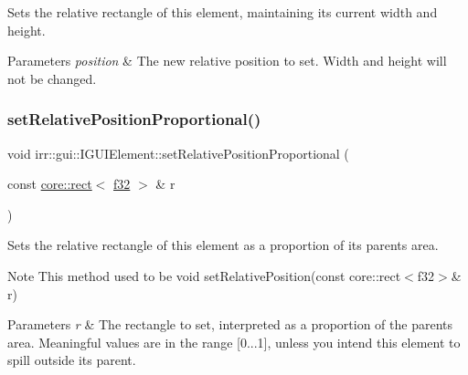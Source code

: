 Sets the relative rectangle of this element, maintaining its current width and height. 


\begin{DoxyParams}{Parameters}
{\em position} & The new relative position to set. Width and height will not be changed. \\
\hline
\end{DoxyParams}
\mbox{\label{classirr_1_1gui_1_1IGUIElement_aa67e02ab54db1068e7c057721d2f24a5}} 
\subsubsection{\texorpdfstring{set\+Relative\+Position\+Proportional()}{setRelativePositionProportional()}}
{\footnotesize\ttfamily void irr\+::gui\+::\+I\+G\+U\+I\+Element\+::set\+Relative\+Position\+Proportional (\begin{DoxyParamCaption}\item[{const \hyperlink{classirr_1_1core_1_1rect}{core\+::rect}$<$ \hyperlink{namespaceirr_a0277be98d67dc26ff93b1a6a1d086b07}{f32} $>$ \&}]{r }\end{DoxyParamCaption})\hspace{0.3cm}{\ttfamily [inline]}}



Sets the relative rectangle of this element as a proportion of its parent\textquotesingle{}s area. 

\begin{DoxyNote}{Note}
This method used to be \textquotesingle{}void set\+Relative\+Position(const core\+::rect$<$f32$>$\& r)\textquotesingle{} 
\end{DoxyNote}

\begin{DoxyParams}{Parameters}
{\em r} & The rectangle to set, interpreted as a proportion of the parent\textquotesingle{}s area. Meaningful values are in the range \mbox{[}0...1\mbox{]}, unless you intend this element to spill outside its parent. \\
\hline
\end{DoxyParams}
\mbox{\label{classirr_1_1gui_1_1IGUIElement_a50eb859808b65ee24fbdd69e69118a8d}} 
